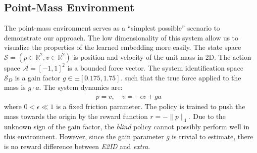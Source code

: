 \documentclass{article}
\newcommand{\R}{\mathbb{R}}
\newcommand{\TODO}[1]{\textcolor{red}{\textbf{TODO: #1}}}
\newcommand{\cA}{\mathcal{A}}
\newcommand{\cS}{\mathcal{S}}
\newcommand{\blind}{\emph{blind}}
\newcommand{\plain}{\emph{plain}}
\newcommand{\extra}{\emph{extra}}
\newcommand{\embed}{\emph{E2ID}}
\begin{document}
\subsection{Point-Mass Environment}
\label{pointmass}
The point-mass environment serves as a ``simplest possible'' scenario to demonstrate our approach.
The low dimensionality of this system allow us to visualize the properties of the learned embedding more easily.
The state space $\cS = (p \in \R^2, v \in \R^2)$ is position and velocity of the unit mass in 2D.
The action space $\cA = [-1, 1]^2$ is a bounded force vector.
The system identification space $\cS_D$ is a gain factor $g \in \pm[0.175, 1.75]$.
such that the true force applied to the mass is $g \cdot a$.
The system dynamics are:
\begin{equation}\begin{split}
\dot p = v, \quad \dot v = -\epsilon v + ga
\end{split}\end{equation}
where $0 < \epsilon \ll 1$ is a fixed friction parameter.
The policy is trained to push the mass towards the origin
by the reward function $r = -\|p\|_1$.
Due to the unknown sign of the gain factor, the \blind{} policy cannot possibly perform well in this environment.
However, since the gain parameter $g$ is trivial to estimate,
there is no reward difference between \embed{} and \extra{}.

\end{document}
